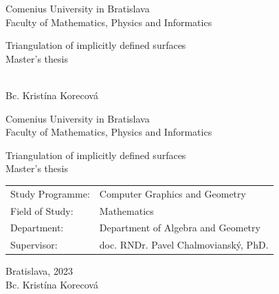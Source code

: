 \documentclass[12pt, twoside]{book}
\def\mfrok{2023}
\def\mfnazov{Triangulation of implicitly defined surfaces}
\def\mftyp{Master's thesis}
\def\mfautor{Bc. Kristína Korecová}
\def\mfskolitel{doc. RNDr. Pavel Chalmovianský, PhD. }
\def\mfkonzultant{tit. Meno Priezvisko, tit. }
\def\mfmiesto{Bratislava, \mfrok}
\def\mfodbor{ Mathematics }
\def\program{ Computer Graphics and Geometry }
\def\mfpracovisko{ Department of Algebra and Geometry }
\begin{document}
     
\frontmatter


\thispagestyle{empty}

\begin{center}
\sc\large
Comenius University in Bratislava\\
Faculty of Mathematics, Physics and Informatics

\vfill

{\LARGE\mfnazov}\\
\mftyp
\end{center}

\vfill

{\sc\large 
\noindent \mfrok\\
\mfautor
}

\cleardoublepage


\thispagestyle{empty}
\noindent

\begin{center}
\sc  
\large
Comenius University in Bratislava\\
Faculty of Mathematics, Physics and Informatics

\vfill

{\LARGE\mfnazov}\\
\mftyp
\end{center}

\vfill

\noindent
\begin{tabular}{ll}
Study Programme: & \program \\
Field of Study: & \mfodbor \\
Department: & \mfpracovisko \\
Supervisor: & \mfskolitel \\
\end{tabular}

\vfill


\noindent \mfmiesto\\
\mfautor

\cleardoublepage


\end{document}
